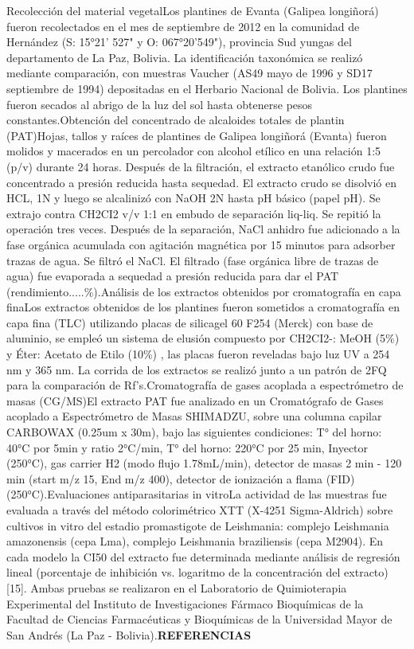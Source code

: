 \documentclass{article}
\begin{document}
{}{Recolección del material vegetal}{Los plantines de Evanta (Galipea longiñorá) fueron recolectados en el mes de septiembre de 2012 en la comunidad de Hernández (S: 15°21' 527" y O: 067°20'549"), provincia Sud yungas del departamento de La Paz, Bolivia. La identificación taxonómica se realizó mediante comparación, con muestras Vaucher (AS49 mayo de 1996 y SD17 septiembre de 1994) depositadas en el Herbario Nacional de Bolivia. Los plantines fueron secados al abrigo de la luz del sol hasta obtenerse pesos constantes.}{Obtención del concentrado de alcaloides totales de plantin (PAT)}{Hojas, tallos y raíces de plantines de Galipea longiñorá (Evanta) fueron molidos y macerados en un percolador con alcohol etílico en una relación 1:5 (p/v) durante 24 horas. Después de la filtración, el extracto etanólico crudo fue concentrado a presión reducida hasta sequedad. El extracto crudo se disolvió en HCL, 1N y luego se alcalinizó con NaOH 2N hasta pH básico (papel pH). Se extrajo contra CH2CI2 v/v 1:1 en embudo de separación liq-liq. Se repitió la operación tres veces. Después de la separación, NaCl anhidro fue adicionado a la fase orgánica acumulada con agitación magnética por 15 minutos para adsorber trazas de agua. Se filtró el NaCl. El filtrado (fase orgánica libre de trazas de agua) fue evaporada a sequedad a presión reducida para dar el PAT (rendimiento.....\%).}{Análisis de los extractos obtenidos por cromatografía en capa fina}{Los extractos obtenidos de los plantines fueron sometidos a cromatografía en capa fina (TLC) utilizando placas de silicagel 60 F254 (Merck) con base de aluminio, se empleó un sistema de elusión compuesto por CH2CI2-: MeOH (5\%) y Éter: Acetato de Etilo (10\%) , las placas fueron reveladas bajo luz UV a 254 nm y 365 nm. La corrida de los extractos se realizó junto a un patrón de 2FQ para la comparación de Rf's.}{Cromatografía de gases acoplada a espectrómetro de masas (CG/MS)}{El extracto PAT fue analizado en un Cromatógrafo de Gases acoplado a Espectrómetro de Masas SHIMADZU, sobre una columna capilar CARBOWAX (0.25um x 30m), bajo las siguientes condiciones: T° del horno: 40°C por 5min y ratio 2°C/min, T° del horno: 220°C por 25 min, Inyector (250°C), gas carrier H2 (modo flujo 1.78mL/min), detector de masas 2 min - 120 min (start m/z 15, End m/z 400), detector de ionización a flama (FID) (250°C).}{Evaluaciones antiparasitarias in vitro}{La actividad de las muestras fue evaluada a través del método colorimétrico XTT (X-4251 Sigma-Aldrich) sobre cultivos in vitro del estadio promastigote de Leishmania: complejo Leishmania amazonensis (cepa Lma), complejo Leishmania braziliensis (cepa M2904). En cada modelo la CI50 del extracto fue determinada mediante análisis de regresión lineal (porcentaje de inhibición vs. logaritmo de la concentración del extracto) [15]. Ambas pruebas se realizaron en el Laboratorio de Quimioterapia Experimental del Instituto de Investigaciones Fármaco Bioquímicas de la Facultad de Ciencias Farmacéuticas y Bioquímicas de la Universidad Mayor de San Andrés (La Paz - Bolivia).}{\renewcommand{\children}{REFERENCIAS}\textbf{\children}
}
\end{document}
